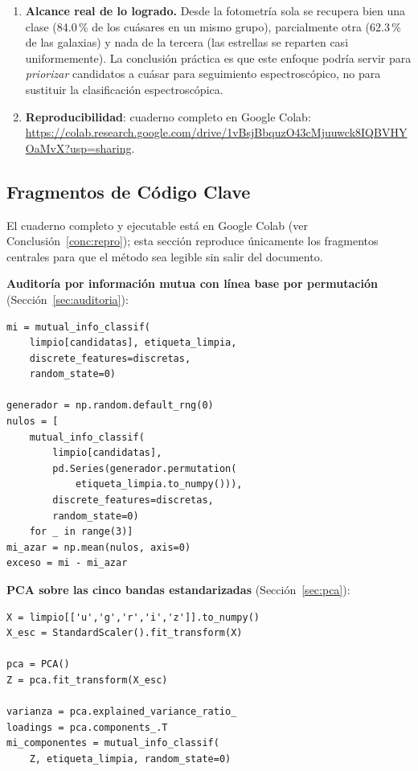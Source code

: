 \documentclass[10pt,journal]{IEEEtran}
\newcommand{\enlacenb}{https://colab.research.google.com/drive/1vBsjBbquzO43cMjuuwck8IQBVHYOaMvX?usp=sharing}
\begin{document}
\begin{enumerate}
    \item \textbf{Alcance real de lo logrado.} Desde la fotometr\'ia sola se recupera bien una clase (84.0\,\% de los cu\'asares en un mismo grupo), parcialmente otra (62.3\,\% de las galaxias) y nada de la tercera (las estrellas se reparten casi uniformemente). La conclusi\'on pr\'actica es que este enfoque podr\'ia servir para \emph{priorizar} candidatos a cu\'asar para seguimiento espectrosc\'opico, no para sustituir la clasificaci\'on espectrosc\'opica.
    \item \textbf{Reproducibilidad}: cuaderno completo en Google Colab: \url{\enlacenb}.
      \label{conc:repro}
  \end{enumerate}

  \appendix

  \subsection{Fragmentos de C\'odigo Clave}

  El cuaderno completo y ejecutable est\'a en Google Colab (ver Conclusi\'on~\ref{conc:repro}); esta secci\'on reproduce \'unicamente los fragmentos centrales para que el m\'etodo sea legible sin salir del documento.

  \textbf{Auditor\'ia por informaci\'on mutua con l\'inea base por permutaci\'on} (Secci\'on~\ref{sec:auditoria}):
  \begin{lstlisting}
mi = mutual_info_classif(
    limpio[candidatas], etiqueta_limpia,
    discrete_features=discretas,
    random_state=0)

generador = np.random.default_rng(0)
nulos = [
    mutual_info_classif(
        limpio[candidatas],
        pd.Series(generador.permutation(
            etiqueta_limpia.to_numpy())),
        discrete_features=discretas,
        random_state=0)
    for _ in range(3)]
mi_azar = np.mean(nulos, axis=0)
exceso = mi - mi_azar
  \end{lstlisting}

  \textbf{PCA sobre las cinco bandas estandarizadas} (Secci\'on~\ref{sec:pca}):
  \begin{lstlisting}
X = limpio[['u','g','r','i','z']].to_numpy()
X_esc = StandardScaler().fit_transform(X)

pca = PCA()
Z = pca.fit_transform(X_esc)

varianza = pca.explained_variance_ratio_
loadings = pca.components_.T
mi_componentes = mutual_info_classif(
    Z, etiqueta_limpia, random_state=0)
  \end{lstlisting}
\end{document}

